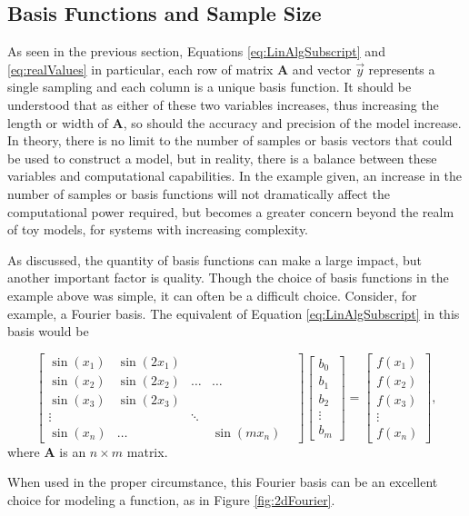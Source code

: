 \subsection{Basis Functions and Sample Size}\label{Sect:samplesAndFunctions}
\par As seen in the previous section, Equations \ref{eq:LinAlgSubscript} and \ref{eq:realValues} in particular, each row of matrix $\mathbf{A}$ and vector $\vec{y}$ represents a single sampling and each column is a unique basis function. It should be understood that as either of these two variables increases, thus increasing the length or width of $\mathbf{A}$, so should the accuracy and precision of the model increase. In theory, there is no limit to the number of samples or basis vectors that could be used to construct a model, but in reality, there is a balance between these variables and computational capabilities. In the example given, an increase in the number of samples or basis functions will not dramatically affect the computational power required, but becomes a greater concern beyond the realm of toy models, for systems with increasing complexity. 
\par As discussed, the quantity of basis functions can make a large impact, but another important factor is quality. Though the choice of basis functions in the example above was simple, it can often be a difficult choice. Consider, for example, a Fourier basis. The equivalent of Equation \ref{eq:LinAlgSubscript} in this basis would be

\begin{equation} \label{eq:fourierBasis}
\begin{bmatrix}
\sin(x_1) & \sin(2x_1) \\
\sin(x_2) & \sin(2x_2) & \ldots & \ldots \\
\sin(x_3) & \sin(2x_3) \\
\vdots & & \ddots & & \\
\sin(x_n) & \ldots & & \sin(mx_n)
\end{bmatrix}
\begin{bmatrix}
b_0 \\
b_1 \\
b_2 \\
\vdots \\
b_m 
\end{bmatrix}
=
\begin{bmatrix}
f(x_1) \\ 
f(x_2) \\
f(x_3) \\ 
\vdots \\
f(x_n)
\end{bmatrix},
\end{equation}
where $\mathbf{A}$ is an $n\times m$ matrix.
\par When used in the proper circumstance, this Fourier basis can be an excellent choice for modeling a function, as in Figure \ref{fig:2dFourier}.


